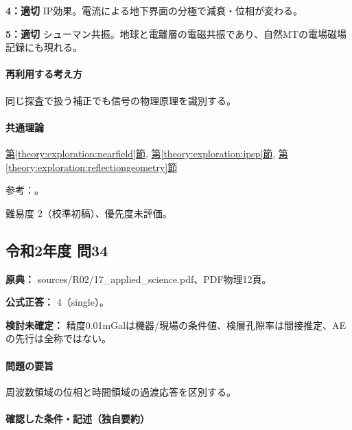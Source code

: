 \noindent\textbf{4：適切} IP効果。電流による地下界面の分極で減衰・位相が変わる。\par

\noindent\textbf{5：適切} シューマン共振。地球と電離層の電磁共振であり、自然MTの電場磁場記録にも現れる。\par

\paragraph{再利用する考え方} 同じ探査で扱う補正でも信号の物理原理を識別する。

\paragraph{共通理論} \hyperref[theory:exploration:nearfield]{第\ref*{theory:exploration:nearfield}節}, \hyperref[theory:exploration:ipsp]{第\ref*{theory:exploration:ipsp}節}, \hyperref[theory:exploration:reflectiongeometry]{第\ref*{theory:exploration:reflectiongeometry}節}

\par 参考：\cite{schumann_mt2009,epa_ip,usgs_csamt2012}。

\par 難易度 2（校準初稿）、優先度未評価。

\subsection{令和2年度 問34}
\label{q:r02-reg-applied-34}

\noindent\textbf{原典：} sources/R02/17\_applied\_science.pdf、PDF物理12頁。

\textbf{公式正答：} 4（single）。

\par\textbf{検討未確定：} 精度0.01mGalは機器/現場の条件値、検層孔隙率は間接推定、AEの先行は全称ではない。

\paragraph{問題の要旨} 周波数領域の位相と時間領域の過渡応答を区別する。

\paragraph{確認した条件・記述（独自要約）}\mbox{}\par

